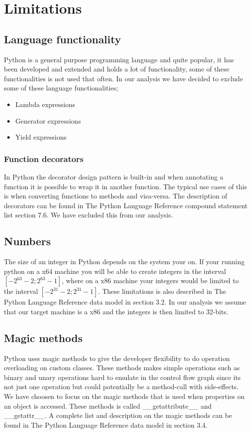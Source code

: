 \chapter{Limitations}

\section{Language functionality}
Python is a general purpose programming language and quite popular, it has been developed and extended and holds a lot of functionality, some of these functionalities is not used that often. In our analysis we have decided to exclude some of these language functionalities;

\begin{itemize}
	\item Lambda expressions
	\item Generator expressions
	\item Yield expressions
\end{itemize}

\subsection{Function decorators}
In Python the decorator design pattern is built-in and when annotating a function it is possible to wrap it in another function. The typical use cases of this is when converting functions to methods and visa-versa. The description of decorators can be found in The Python Language Reference compound statement list\cite{pyref.compound} section 7.6. We have excluded this from our analysis.


\section{Numbers}
The size of an integer in Python depends on the system your on. If your running python on a x64 machine you will be able to create integers in the interval $[-2^{63}-2;2^{63}-1]$, where on a x86 machine your integers would be limited to the interval $[-2^{31}-2;2^{31}-1]$. These limitations is also described in The Python Language Reference data model\cite{pyref.datamodel} in section 3.2. In our analysis we assume that our target machine is a x86 and the integers is then limited to 32-bits.

\section{Magic methods}
Python uses magic methods to give the developer flexibility to do operation overloading on custom classes. These methods makes simple operations such as binary and unary operations hard to emulate in the control flow graph since its not just one operation but could potentially be a method-call with side-effects. \\
We have choosen to focus on the magic methods that is used when properties on an object is accessed. These methods is called \_\_getattribute\_\_ and \_\_getattr\_\_. A complete list and description on the magic methods can be found in The Python Language Reference data model\cite{pyref.datamodel} in section 3.4.
